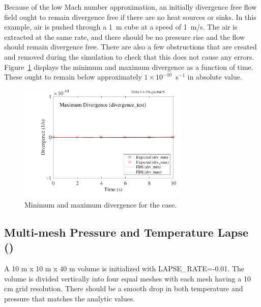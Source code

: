 \documentclass[11pt]{book}
\begin{document}
Because of the low Mach number approximation, an initially divergence free flow field ought to remain divergence free if there are no heat sources or sinks. In this example, air is pushed through a 1~m cube at a speed of 1~m/s. The air is extracted at the same rate, and there should be no pressure rise and the flow should remain divergence free. There are also a few obstructions that are created and removed during the simulation to check that this does not cause any errors. Figure~\ref{divergence_test} displays the minimum and maximum divergence as a function of time. These ought to remain below approximately $1 \times 10^{-10}$~s$^{-1}$ in absolute value.
\begin{figure}[h!]
\begin{center}
\includegraphics[width=3.2in]{SCRIPT_FIGURES/divergence_test}
\end{center}
\caption[The  case]{Minimum and maximum divergence for the  case.}
\label{divergence_test}
\end{figure}

\subsection{Multi-mesh Pressure and Temperature Lapse (\texorpdfstring{}{lapse\_rate})}

A 10 m x 10 m x 40 m volume is initialized with {\ct LAPSE\_RATE=-0.01}.  The volume is divided vertically into four equal meshes with each mesh having a 10 cm grid resolution.  There should be a smooth drop in both temperature and pressure that matches the analytic values.
\end{document}

